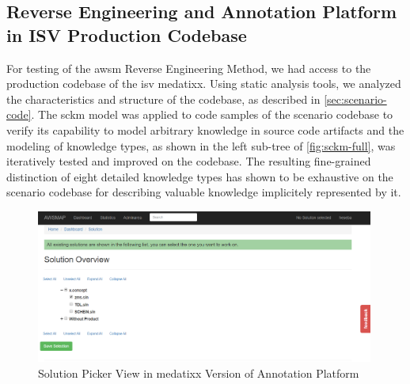 \vspace{-20pt}
\subsection{Reverse Engineering and Annotation Platform in ISV Production Codebase}
\vspace{15pt}

For testing of the \gls{awsm} Reverse Engineering Method, we had access to the production codebase of the \gls{isv} medatixx.
Using static analysis tools, we analyzed the characteristics and structure of the codebase, as described in \cref{sec:scenario-code}.
The \gls{sckm} model was applied to code samples of the scenario codebase to verify its capability to model arbitrary knowledge in \legacy source code \glspl{artifact} and the modeling of knowledge types, as shown in the left sub-tree of \cref{fig:sckm-full}, was iteratively tested and improved on the codebase.
The resulting fine-grained distinction of eight detailed knowledge types has shown to be exhaustive on the scenario codebase for describing valuable knowledge implicitely represented by it.\pagebreak

\begin{figure}[h!]
\hypertarget{fig:eval.awsmap}{%
\centering
\includegraphics[width=0.99\textwidth]{../figures/screenshots/awsmap-solution-picker.png}
\caption[Solution Picker View]{Solution Picker View in medatixx Version of Annotation Platform}\label{fig:eval.awsmap}
}
\end{figure}\vspace{-20pt}

